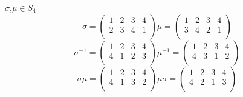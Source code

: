 \begin{example}
    \(\sigma\),\(\mu\in S_4\)
    \[\sigma=\left( 
    \begin{array}{cccc}
    1 & 2 & 3 & 4 \\
    2 & 3 & 4 & 1 \\
    \end{array}
    \right)
    \mu=\left( 
    \begin{array}{cccc}
    1 & 2 & 3 & 4 \\
    3 & 4 & 2 & 1 \\
    \end{array}
    \right)
    \]
    \[\sigma^{-1}=\left( 
    \begin{array}{cccc}
    1 & 2 & 3 & 4 \\
    4 & 1 & 2 & 3 \\
    \end{array}
    \right)
    \mu^{-1}=\left( 
    \begin{array}{cccc}
    1 & 2 & 3 & 4 \\
    4 & 3 & 1 & 2 \\
    \end{array}
    \right)
    \]
    \[\sigma\mu=\left( 
    \begin{array}{cccc}
    1 & 2 & 3 & 4 \\
    4 & 1 & 3 & 2 \\
    \end{array}
    \right)
    \mu\sigma=\left( 
    \begin{array}{cccc}
    1 & 2 & 3 & 4 \\
    4 & 2 & 1 & 3 \\
    \end{array}
    \right)
    \]
\end{example}
\newpage
